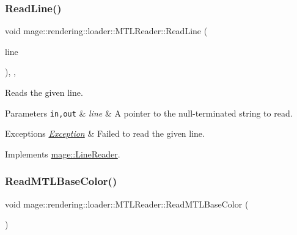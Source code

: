 \subsubsection{\texorpdfstring{Read\+Line()}{ReadLine()}}
{\footnotesize\ttfamily void mage\+::rendering\+::loader\+::\+M\+T\+L\+Reader\+::\+Read\+Line (\begin{DoxyParamCaption}\item[{\mbox{\hyperlink{namespacemage_a8769f9d670d6b585ea306cb1062af94b}{Not\+Null}}$<$ \mbox{\hyperlink{namespacemage_a4163ec9a9a27d5e7f4b452dcb99cb2b9}{zstring}} $>$}]{line }\end{DoxyParamCaption})\hspace{0.3cm}{\ttfamily [override]}, {\ttfamily [private]}, {\ttfamily [virtual]}}

Reads the given line.


\begin{DoxyParams}[1]{Parameters}
\mbox{\tt in,out}  & {\em line} & A pointer to the null-\/terminated string to read. \\
\hline
\end{DoxyParams}

\begin{DoxyExceptions}{Exceptions}
{\em \mbox{\hyperlink{classmage_1_1_exception}{Exception}}} & Failed to read the given line. \\
\hline
\end{DoxyExceptions}


Implements \mbox{\hyperlink{classmage_1_1_line_reader_ae50ac0637eddead37a7a9cca2a570072}{mage\+::\+Line\+Reader}}.

\mbox{\label{classmage_1_1rendering_1_1loader_1_1_m_t_l_reader_ae228231b40bc5b8a6fdff3a9a5698530}} 
\subsubsection{\texorpdfstring{Read\+M\+T\+L\+Base\+Color()}{ReadMTLBaseColor()}}
{\footnotesize\ttfamily void mage\+::rendering\+::loader\+::\+M\+T\+L\+Reader\+::\+Read\+M\+T\+L\+Base\+Color (\begin{DoxyParamCaption}{ }\end{DoxyParamCaption})\hspace{0.3cm}{\ttfamily [private]}}

